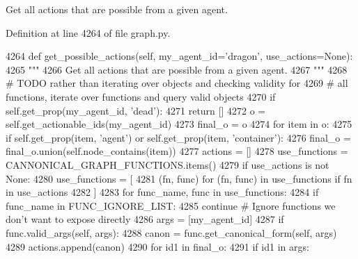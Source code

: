\begin{DoxyVerb}Get all actions that are possible from a given agent.
\end{DoxyVerb}
 

Definition at line 4264 of file graph.\+py.


\begin{DoxyCode}
4264     \textcolor{keyword}{def }get\_possible\_actions(self, my\_agent\_id='dragon', use\_actions=None):
4265         \textcolor{stringliteral}{"""}
4266 \textcolor{stringliteral}{        Get all actions that are possible from a given agent.}
4267 \textcolor{stringliteral}{        """}
4268         \textcolor{comment}{# TODO rather than iterating over objects and checking validity for}
4269         \textcolor{comment}{# all functions, iterate over functions and query valid objects}
4270         \textcolor{keywordflow}{if} self.get\_prop(my\_agent\_id, \textcolor{stringliteral}{'dead'}):
4271             \textcolor{keywordflow}{return} []
4272         o = self.get\_actionable\_ids(my\_agent\_id)
4273         final\_o = o
4274         \textcolor{keywordflow}{for} item \textcolor{keywordflow}{in} o:
4275             \textcolor{keywordflow}{if} self.get\_prop(item, \textcolor{stringliteral}{'agent'}) \textcolor{keywordflow}{or} self.get\_prop(item, \textcolor{stringliteral}{'container'}):
4276                 final\_o = final\_o.union(self.node\_contains(item))
4277         actions = []
4278         use\_functions = CANNONICAL\_GRAPH\_FUNCTIONS.items()
4279         \textcolor{keywordflow}{if} use\_actions \textcolor{keywordflow}{is} \textcolor{keywordflow}{not} \textcolor{keywordtype}{None}:
4280             use\_functions = [
4281                 (fn, func) \textcolor{keywordflow}{for} (fn, func) \textcolor{keywordflow}{in} use\_functions \textcolor{keywordflow}{if} fn \textcolor{keywordflow}{in} use\_actions
4282             ]
4283         \textcolor{keywordflow}{for} func\_name, func \textcolor{keywordflow}{in} use\_functions:
4284             \textcolor{keywordflow}{if} func\_name \textcolor{keywordflow}{in} FUNC\_IGNORE\_LIST:
4285                 \textcolor{keywordflow}{continue}  \textcolor{comment}{# Ignore functions we don't want to expose directly}
4286             args = [my\_agent\_id]
4287             \textcolor{keywordflow}{if} func.valid\_args(self, args):
4288                 canon = func.get\_canonical\_form(self, args)
4289                 actions.append(canon)
4290             \textcolor{keywordflow}{for} id1 \textcolor{keywordflow}{in} final\_o:
4291                 \textcolor{keywordflow}{if} id1 \textcolor{keywordflow}{in} args:

\end{DoxyCode}
